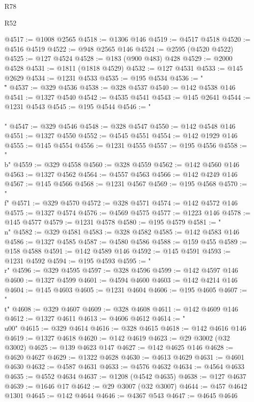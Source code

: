 \begin{lexlean}{R78}
\begin{lexlean}{R52}
\begin{coremodule}
{{{{{{{{{{{{{{{{{{{{{{{{{{{{{{{{{{{{{{{{{{{{{{{{{{{{{{{{{{{{{{{{{{{{{{{{{{{{{{{{{{{{{{{{{{{{{{{{{{{{{{{{{{{{{{{{{{{{{{{{{{{{{{{{{{{{{{{{{{{{{{{{{{{{{{{{{{{{{{{{{{{{{{{{{{{{{{{{{{{{{{{{{{{{{{{{{{{{{{@4517 := @1008 @2565
@4518 := @1306 @146
@4519 := @4517 @4518
@4520 := @4516 @4519
@4522 := @948 @2565 @146
@4524 := @2595 (@4520 @4522)
@4525 := @127 @4524
@4528 := @183 (@900 @483) @428
@4529 := @2000 @4528
@4531 := @1811 (@1818 @4529)
@4532 := @127 @4531
@4533 := @145 @2629
@4534 := @1231 @4533
@4535 := @195 @4534
@4536 := "\\\""
@4537 := @329 @4536
@4538 := @328 @4537
@4540 := @142 @4538 @146
@4541 := @1327 @4540
@4542 := @4535 @4541
@4543 := @145 @2641
@4544 := @1231 @4543
@4545 := @195 @4544
@4546 := "\\\\"
@4547 := @329 @4546
@4548 := @328 @4547
@4550 := @142 @4548 @146
@4551 := @1327 @4550
@4552 := @4545 @4551
@4554 := @142 @1929 @146
@4555 := @145 @4554
@4556 := @1231 @4555
@4557 := @195 @4556
@4558 := "\\b"
@4559 := @329 @4558
@4560 := @328 @4559
@4562 := @142 @4560 @146
@4563 := @1327 @4562
@4564 := @4557 @4563
@4566 := @142 @4249 @146
@4567 := @145 @4566
@4568 := @1231 @4567
@4569 := @195 @4568
@4570 := "\\f"
@4571 := @329 @4570
@4572 := @328 @4571
@4574 := @142 @4572 @146
@4575 := @1327 @4574
@4576 := @4569 @4575
@4577 := @1223 @146
@4578 := @145 @4577
@4579 := @1231 @4578
@4580 := @195 @4579
@4581 := "\\n"
@4582 := @329 @4581
@4583 := @328 @4582
@4585 := @142 @4583 @146
@4586 := @1327 @4585
@4587 := @4580 @4586
@4588 := @159 @455
@4589 := @158 @4588
@4591 := @142 @4589 @146
@4592 := @145 @4591
@4593 := @1231 @4592
@4594 := @195 @4593
@4595 := "\\r"
@4596 := @329 @4595
@4597 := @328 @4596
@4599 := @142 @4597 @146
@4600 := @1327 @4599
@4601 := @4594 @4600
@4603 := @142 @4214 @146
@4604 := @145 @4603
@4605 := @1231 @4604
@4606 := @195 @4605
@4607 := "\\t"
@4608 := @329 @4607
@4609 := @328 @4608
@4611 := @142 @4609 @146
@4612 := @1327 @4611
@4613 := @4606 @4612
@4614 := "\\u00"
@4615 := @329 @4614
@4616 := @328 @4615
@4618 := @142 @4616 @146
@4619 := @1327 @4618
@4620 := @142 @4619
@4623 := @29 @3002 (@32 @3002)
@4625 := @139 @4623 @147
@4627 := @142 @4625 @146
@4628 := @4620 @4627
@4629 := @1322 @4628
@4630 := @4613 @4629
@4631 := @4601 @4630
@4632 := @4587 @4631
@4633 := @4576 @4632
@4634 := @4564 @4633
@4635 := @4552 @4634
@4637 := @1208 (@4542 @4635)
@4638 := @127 @4637
@4639 := @1646 @17
@4642 := @29 @3007 (@32 @3007)
@4644 := @457 @4642 @1301
@4645 := @142 @4644
@4646 := @4367 @543
@4647 := @4645 @4646
}}}}}}}}}}}}}}}}}}}}}}}}}}}}}}}}}}}}}}}}}}}}}}}}}}}}}}}}}}}}}}}}}}}}}}}}}}}}}}}}}}}}}}}}}}}}}}}}}}}}}}}}}}}}}}}}}}}}}}}}}}}}}}}}}}}}}}}}}}}}}}}}}}}}}}}}}}}}}}}}}}}}}}}}}}}}}}}}}}}}}}}}}}}}}}}}}}}}}}
\end{coremodule}
\end{lexlean}
\end{lexlean}
